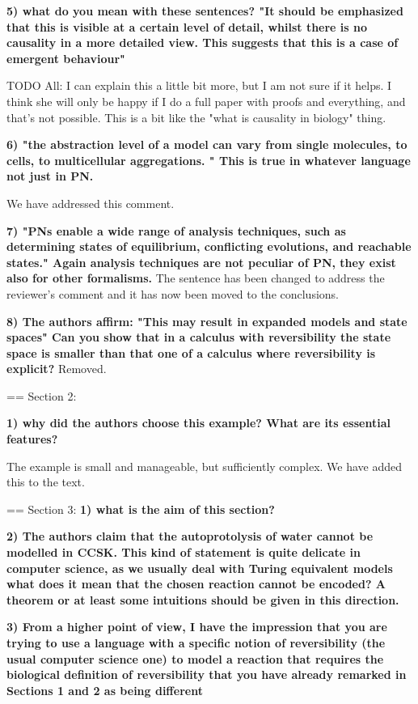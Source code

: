 \documentclass{article}
\begin{document}
\textbf{5) what do you mean with these sentences? "It should be emphasized that this is visible at a certain level of detail, whilst there is no causality in a more detailed view. This suggests that this is a case of emergent behaviour"}

TODO All: I can explain this a little bit more, but I am not sure if it helps. I think she will only be happy if I do a full paper with proofs and everything, and that's not possible. This is a bit like the "what is causality in biology" thing.

\textbf{6) "the abstraction level of a model can vary from single molecules, to cells, to multicellular aggregations. "
This is true in whatever language not just in PN.}

We have addressed this comment. 

\textbf{7) "PNs enable a wide range of analysis techniques, such as determining states of equilibrium, conflicting evolutions, and reachable states."
Again analysis techniques are not peculiar of PN, they exist also for other formalisms.}
The sentence has been changed to address the reviewer's comment and it has now been moved to the conclusions. 

\textbf{8) The authors affirm: 
"This may result in expanded models and state spaces" Can you show that in a calculus with reversibility the state space is smaller than that one of a calculus where reversibility is explicit?}
Removed.

== Section 2: 

\textbf{1) why did the authors choose this example? What are its essential features?}

The example is small and manageable, but sufficiently complex. We have added this to the text.


== Section 3:
\textbf{1) what is the aim of this section?}

\textbf{2) The authors claim that the autoprotolysis of water cannot be modelled in CCSK.
This kind of statement is quite delicate in computer science, as we usually deal with Turing equivalent models what does it mean that the chosen reaction cannot be encoded? A theorem or at least some intuitions should be given in this direction.}

\textbf{3) From a higher point of view, I have the impression that you are trying to use a language with a specific notion of reversibility (the usual computer science one) to model a reaction that requires the biological definition of reversibility that you have already remarked in Sections 1 and 2 as being different}
\end{document}
